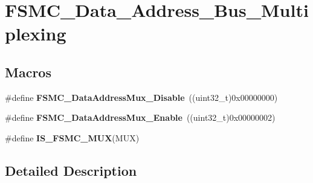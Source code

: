 \hypertarget{group___f_s_m_c___data___address___bus___multiplexing}{\section{F\-S\-M\-C\-\_\-\-Data\-\_\-\-Address\-\_\-\-Bus\-\_\-\-Multiplexing}
\label{group___f_s_m_c___data___address___bus___multiplexing}
}
\subsection*{Macros}
\begin{DoxyCompactItemize}
\item 
\hypertarget{group___f_s_m_c___data___address___bus___multiplexing_ga62d92adbcbcc1d6ec9a04de1b343744a}{\#define {\bfseries F\-S\-M\-C\-\_\-\-Data\-Address\-Mux\-\_\-\-Disable}~((uint32\-\_\-t)0x00000000)}\label{group___f_s_m_c___data___address___bus___multiplexing_ga62d92adbcbcc1d6ec9a04de1b343744a}

\item 
\hypertarget{group___f_s_m_c___data___address___bus___multiplexing_ga1dd4d12e63aaf29dbb8ae4b613f2aa15}{\#define {\bfseries F\-S\-M\-C\-\_\-\-Data\-Address\-Mux\-\_\-\-Enable}~((uint32\-\_\-t)0x00000002)}\label{group___f_s_m_c___data___address___bus___multiplexing_ga1dd4d12e63aaf29dbb8ae4b613f2aa15}

\item 
\#define {\bfseries I\-S\-\_\-\-F\-S\-M\-C\-\_\-\-M\-U\-X}(M\-U\-X)
\end{DoxyCompactItemize}


\subsection{Detailed Description}


